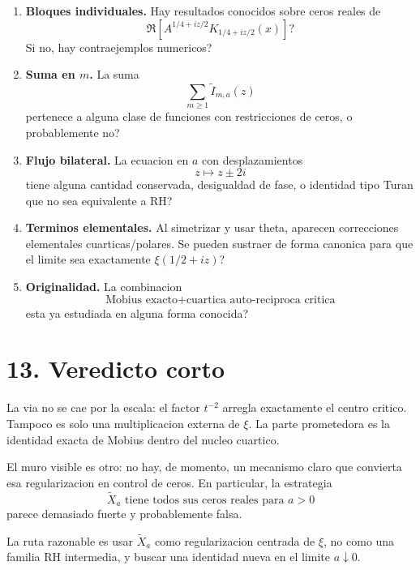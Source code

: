 \documentclass[11pt]{article}
\begin{document}
\begin{enumerate}
\item \textbf{Bloques individuales.} Hay resultados conocidos sobre ceros
reales de
\[
\Re\left[A^{1/4+iz/2}K_{1/4+iz/2}(x)\right]?
\]
Si no, hay contraejemplos numericos?

\item \textbf{Suma en \(m\).} La suma
\[
\sum_{m\ge1}\widetilde I_{m,a}(z)
\]
pertenece a alguna clase de funciones con restricciones de ceros, o
probablemente no?

\item \textbf{Flujo bilateral.} La ecuacion en \(a\) con desplazamientos
\[
z\mapsto z\pm2i
\]
tiene alguna cantidad conservada, desigualdad de fase, o identidad tipo Turan
que no sea equivalente a RH?

\item \textbf{Terminos elementales.} Al simetrizar y usar theta, aparecen
correcciones elementales cuarticas/polares. Se pueden sustraer de forma
canonica para que el limite sea exactamente \(\xi(1/2+iz)\)?

\item \textbf{Originalidad.} La combinacion
\[
\text{Mobius exacto}+\text{cuartica auto-reciproca critica}
\]
esta ya estudiada en alguna forma conocida?
\end{enumerate}

\section*{13. Veredicto corto}

La via no se cae por la escala: el factor \(t^{-2}\) arregla exactamente el
centro critico. Tampoco es solo una multiplicacion externa de \(\xi\). La
parte prometedora es la identidad exacta de Mobius dentro del nucleo cuartico.

El muro visible es otro: no hay, de momento, un mecanismo claro que convierta
esa regularizacion en control de ceros. En particular, la estrategia
\[
\widetilde X_a \text{ tiene todos sus ceros reales para } a>0
\]
parece demasiado fuerte y probablemente falsa.

La ruta razonable es usar \(\widetilde X_a\) como regularizacion centrada de
\(\xi\), no como una familia RH intermedia, y buscar una identidad nueva en el
limite \(a\downarrow0\).
\end{document}
